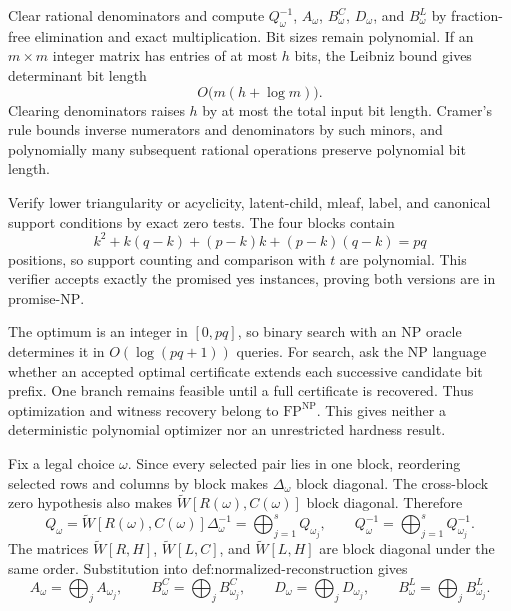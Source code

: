Clear rational denominators and compute \(Q_\omega^{-1}\), \(A_\omega\), \(B^C_\omega\), \(D_\omega\), and \(B^L_\omega\) by fraction-free elimination and exact multiplication. Bit sizes remain polynomial. If an \(m\times m\) integer matrix has entries of at most \(h\) bits, the Leibniz bound gives determinant bit length
\[
O\bigl(m(h+\log m)\bigr).
\]
Clearing denominators raises \(h\) by at most the total input bit length. Cramer's rule bounds inverse numerators and denominators by such minors, and polynomially many subsequent rational operations preserve polynomial bit length.

Verify lower triangularity or acyclicity, latent-child, mleaf, label, and canonical support conditions by exact zero tests. The four blocks contain
\[
k^2+k(q-k)+(p-k)k+(p-k)(q-k)=pq
\]
positions, so support counting and comparison with \(t\) are polynomial. This verifier accepts exactly the promised yes instances, proving both versions are in promise-\(\mathrm{NP}\).

The optimum is an integer in \([0,pq]\), so binary search with an \(\mathrm{NP}\) oracle determines it in \(O(\log(pq+1))\) queries. For search, ask the \(\mathrm{NP}\) language whether an accepted optimal certificate extends each successive candidate bit prefix. One branch remains feasible until a full certificate is recovered. Thus optimization and witness recovery belong to \(\mathrm{FP}^{\mathrm{NP}}\). This gives neither a deterministic polynomial optimizer nor an unrestricted hardness result.

Fix a legal choice \(\omega\). Since every selected pair lies in one block, reordering selected rows and columns by block makes \(\Delta_\omega\) block diagonal. The cross-block zero hypothesis also makes \(\widetilde W[R(\omega),C(\omega)]\) block diagonal. Therefore
\[
Q_\omega
=\widetilde W[R(\omega),C(\omega)]\Delta_\omega^{-1}
=\bigoplus_{j=1}^{s}Q_{\omega_j},
\qquad
Q_\omega^{-1}=\bigoplus_{j=1}^{s}Q_{\omega_j}^{-1}.
\]
The matrices \(\widetilde W[R,H]\), \(\widetilde W[L,C]\), and \(\widetilde W[L,H]\) are block diagonal under the same order. Substitution into \(\text{def:normalized-reconstruction}\) gives
\[
A_\omega=\bigoplus_jA_{\omega_j},\qquad
B^C_\omega=\bigoplus_jB^C_{\omega_j},\qquad
D_\omega=\bigoplus_jD_{\omega_j},\qquad
B^L_\omega=\bigoplus_jB^L_{\omega_j}.
\]

